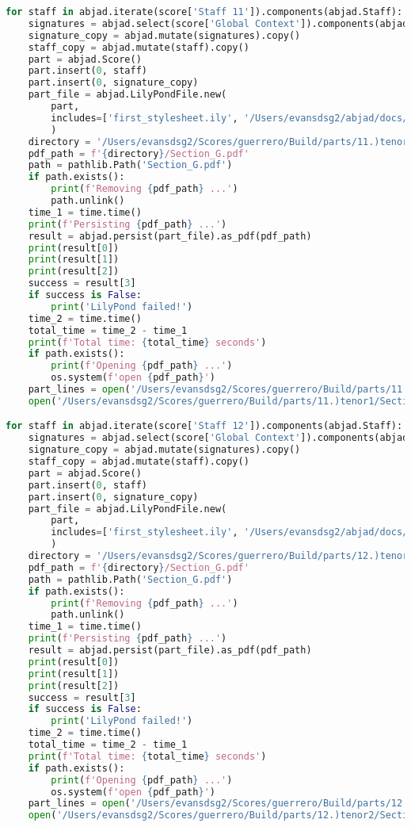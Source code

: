 \begin{lstlisting}[language=Python, caption=Invocation Source Code]
for staff in abjad.iterate(score['Staff 11']).components(abjad.Staff):
    signatures = abjad.select(score['Global Context']).components(abjad.Staff)
    signature_copy = abjad.mutate(signatures).copy()
    staff_copy = abjad.mutate(staff).copy()
    part = abjad.Score()
    part.insert(0, staff)
    part.insert(0, signature_copy)
    part_file = abjad.LilyPondFile.new(
        part,
        includes=['first_stylesheet.ily', '/Users/evansdsg2/abjad/docs/source/_stylesheets/abjad.ily'],
        )
    directory = '/Users/evansdsg2/Scores/guerrero/Build/parts/11.)tenor1'
    pdf_path = f'{directory}/Section_G.pdf'
    path = pathlib.Path('Section_G.pdf')
    if path.exists():
        print(f'Removing {pdf_path} ...')
        path.unlink()
    time_1 = time.time()
    print(f'Persisting {pdf_path} ...')
    result = abjad.persist(part_file).as_pdf(pdf_path)
    print(result[0])
    print(result[1])
    print(result[2])
    success = result[3]
    if success is False:
        print('LilyPond failed!')
    time_2 = time.time()
    total_time = time_2 - time_1
    print(f'Total time: {total_time} seconds')
    if path.exists():
        print(f'Opening {pdf_path} ...')
        os.system(f'open {pdf_path}')
    part_lines = open('/Users/evansdsg2/Scores/guerrero/Build/parts/11.)tenor1/Section_G.ly').readlines()
    open('/Users/evansdsg2/Scores/guerrero/Build/parts/11.)tenor1/Section_G.ly', 'w').writelines(part_lines[15:-1])

for staff in abjad.iterate(score['Staff 12']).components(abjad.Staff):
    signatures = abjad.select(score['Global Context']).components(abjad.Staff)
    signature_copy = abjad.mutate(signatures).copy()
    staff_copy = abjad.mutate(staff).copy()
    part = abjad.Score()
    part.insert(0, staff)
    part.insert(0, signature_copy)
    part_file = abjad.LilyPondFile.new(
        part,
        includes=['first_stylesheet.ily', '/Users/evansdsg2/abjad/docs/source/_stylesheets/abjad.ily'],
        )
    directory = '/Users/evansdsg2/Scores/guerrero/Build/parts/12.)tenor2'
    pdf_path = f'{directory}/Section_G.pdf'
    path = pathlib.Path('Section_G.pdf')
    if path.exists():
        print(f'Removing {pdf_path} ...')
        path.unlink()
    time_1 = time.time()
    print(f'Persisting {pdf_path} ...')
    result = abjad.persist(part_file).as_pdf(pdf_path)
    print(result[0])
    print(result[1])
    print(result[2])
    success = result[3]
    if success is False:
        print('LilyPond failed!')
    time_2 = time.time()
    total_time = time_2 - time_1
    print(f'Total time: {total_time} seconds')
    if path.exists():
        print(f'Opening {pdf_path} ...')
        os.system(f'open {pdf_path}')
    part_lines = open('/Users/evansdsg2/Scores/guerrero/Build/parts/12.)tenor2/Section_G.ly').readlines()
    open('/Users/evansdsg2/Scores/guerrero/Build/parts/12.)tenor2/Section_G.ly', 'w').writelines(part_lines[15:-1])


\end{lstlisting}
